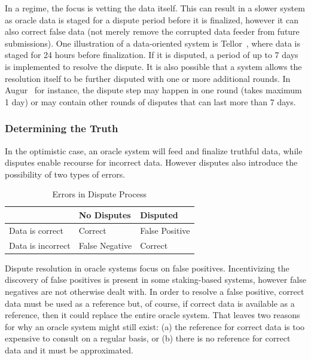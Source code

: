 In a  regime, the focus is vetting the data itself. This can result in a slower system as oracle data is staged for a dispute period before it is finalized, however it can also correct false data (not merely remove the corrupted data feeder from future submissions). One illustration of a data-oriented system is Tellor~\cite{tellorWhitepaper,tellordispute}, where data is staged for 24 hours before finalization. If it is disputed, a period of up to 7 days is implemented to resolve the dispute. It is also possible that a system allows the resolution itself to be further disputed with one or more additional rounds. In Augur~\cite{peterson2015augur} for instance, the dispute step may happen in one round (takes maximum 1 day) or may contain other rounds of disputes that can last more than 7 days. 



\subsubsection{Determining the Truth}

In the optimistic case, an oracle system will feed and finalize truthful data, while disputes enable recourse for incorrect data. However disputes also introduce the possibility of two types of errors.
\begin{table}
	
	\begin{center}
	\begin{tabular}{l|l|l}
	& No Disputes & Disputed \\ \hline
	Data is correct & Correct & False Positive \\
	Data is incorrect & False Negative & Correct \\
	\end{tabular}
	\end{center}
	\caption{Errors in Dispute Process}

\end{table}
Dispute resolution in oracle systems focus on false positives. Incentivizing the discovery of false positives is present in some staking-based systems, however false negatives are not otherwise dealt with. In order to resolve a false positive, correct data must be used as a reference but, of course, if correct data is available as a reference, then it could replace the entire oracle system. That leaves two reasons for why an oracle system might still exist: (a) the reference for correct data is too expensive to consult on a regular basis, or (b) there is no reference for correct data and it must be approximated. 

